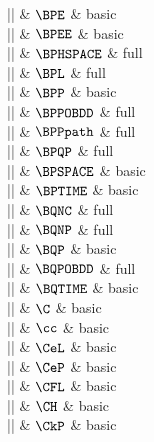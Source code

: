 |\BPE|    & $\BPE$ & basic \\

|\BPEE|    & $\BPEE$ & basic \\

|\BPHSPACE|    & $\BPHSPACE$ & full \\

|\BPL|    & $\BPL$ & full \\

|\BPP|    & $\BPP$ & basic \\

|\BPPOBDD|    & $\BPPOBDD$ & full \\

|\BPPpath|    & $\BPPpath$ & full \\

|\BPQP|    & $\BPQP$ & full \\

|\BPSPACE|    & $\BPSPACE$ & basic \\

|\BPTIME|    & $\BPTIME$ & basic \\

|\BQNC|    & $\BQNC$ & full \\

|\BQNP|    & $\BQNP$ & full \\

|\BQP|    & $\BQP$ & basic \\

|\BQPOBDD|    & $\BQPOBDD$ & full \\

|\BQTIME|    & $\BQTIME$ & basic \\

|\C|    & $\C$ & basic \\

|\cc|    & $\cc$ & basic \\

|\CeL|    & $\CeL$ & basic \\

|\CeP|    & $\CeP$ & basic \\

|\CFL|    & $\CFL$ & basic \\

|\CH|    & $\CH$ & basic \\


|\CkP|    & $\CkP$ & basic \\

